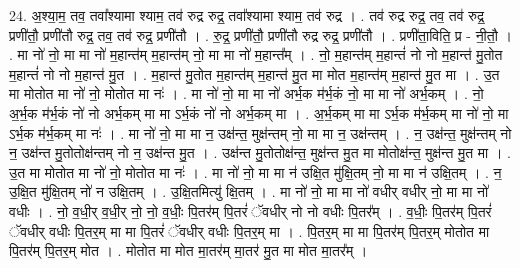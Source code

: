 \documentclass[17pt]{extarticle}
\begin{document}
24. अ॒श्या॒म॒ तव॒ तवा᳚श्यामा श्याम॒ तव॑ रुद्र रुद्र॒ तवा᳚श्यामा श्याम॒ तव॑ रुद्र । . तव॑ रुद्र रुद्र॒ तव॒ तव॑ रुद्र॒ प्रणी॑तौ॒ प्रणी॑तौ रुद्र॒ तव॒ तव॑ रुद्र॒ प्रणी॑तौ । . रु॒द्र॒ प्रणी॑तौ॒ प्रणी॑तौ रुद्र रुद्र॒ प्रणी॑तौ । . प्रणी॑ता॒विति॒ प्र - नी॒तौ॒ । . मा नो॑ नो॒ मा मा नो॑ म॒हान्त॑म् म॒हान्त॑म् नो॒ मा मा नो॑ म॒हान्त᳚म् । . नो॒ म॒हान्त॑म् म॒हान्तं॑ नो नो म॒हान्त॑ मु॒तोत म॒हान्तं॑ नो नो म॒हान्त॑ मु॒त । . म॒हान्त॑ मु॒तोत म॒हान्त॑म् म॒हान्त॑ मु॒त मा मोत म॒हान्त॑म् म॒हान्त॑ मु॒त मा । . उ॒त मा मोतोत मा नो॑ नो॒ मोतोत मा नः॑ । . मा नो॑ नो॒ मा मा नो॑ अर्भ॒क म॑र्भ॒कं नो॒ मा मा नो॑ अर्भ॒कम् । . नो॒ अ॒र्भ॒क म॑र्भ॒कं नो॑ नो अर्भ॒कम् मा मा ऽर्भ॒कं नो॑ नो अर्भ॒कम् मा । . अ॒र्भ॒कम् मा मा ऽर्भ॒क म॑र्भ॒कम् मा नो॑ नो॒ मा ऽर्भ॒क म॑र्भ॒कम् मा नः॑ । . मा नो॑ नो॒ मा मा न॒ उक्ष॑न्त॒ मुक्ष॑न्तम् नो॒ मा मा न॒ उक्ष॑न्तम् । . न॒ उक्ष॑न्त॒ मुक्ष॑न्तम् नो न॒ उक्ष॑न्त मु॒तोतोक्ष॑न्तम् नो न॒ उक्ष॑न्त मु॒त । . उक्ष॑न्त मु॒तोतोक्ष॑न्त॒ मुक्ष॑न्त मु॒त मा मोतोक्ष॑न्त॒ मुक्ष॑न्त मु॒त मा । . उ॒त मा मोतोत मा नो॑ नो॒ मोतोत मा नः॑ । . मा नो॑ नो॒ मा मा न॑ उक्षि॒त मु॑क्षि॒तम् नो॒ मा मा न॑ उक्षि॒तम् । . न॒ उ॒क्षि॒त मु॑क्षि॒तम् नो॑ न उक्षि॒तम् । . उ॒क्षि॒तमित्यु॑ क्षि॒तम् । . मा नो॑ नो॒ मा मा नो॑ वधीर् वधीर् नो॒ मा मा नो॑ वधीः । . नो॒ व॒धी॒र् व॒धी॒र् नो॒ नो॒ व॒धीः॒ पि॒तर॑म् पि॒तरं॑ ॅवधीर् नो नो वधीः पि॒तर᳚म् । . व॒धीः॒ पि॒तर॑म् पि॒तरं॑ ॅवधीर् वधीः पि॒तर॒म् मा मा पि॒तरं॑ ॅवधीर् वधीः पि॒तर॒म् मा । . पि॒तर॒म् मा मा पि॒तर॑म् पि॒तर॒म् मोतोत मा पि॒तर॑म् पि॒तर॒म् मोत । . मोतोत मा मोत मा॒तर॑म् मा॒तर॑ मु॒त मा मोत मा॒तर᳚म् । \newline
\end{document}

